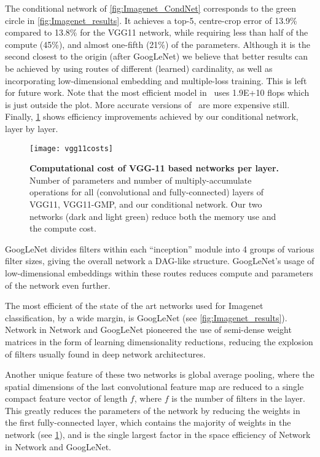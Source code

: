 \documentclass[thesis]{subfiles}
\begin{document}
	The conditional network of \cref{fig:Imagenet_CondNet} 
	corresponds to the green circle in \cref{fig:Imagenet_results}.
	It achieves a top-5, centre-crop error of
	13.9\% compared to 13.8\% for the VGG11 network, while requiring less than half of the compute (45\%),
	and almost one-fifth (21\%) of the parameters.
	Although it is the second closest to the origin (after GoogLeNet) we believe that better results can be achieved 
	by using routes of different (learned) cardinality, as well as incorporating low-dimensional embedding and multiple-loss training. This is left for future work. 
	Note that the most efficient model in~\citep{He2015b} uses 1.9E+10 flops which is just outside the plot. 
	More accurate versions of~\citep{He2015b} are more expensive still.
	Finally, \cref{fig:VggPerLayerCost} shows efficiency improvements achieved by our conditional network, layer by layer.
	
	\begin{figure}[tbp]
		\centering
		\texttt{[image: vgg11costs]}
		\caption[Computational cost of VGG-11 based networks per layer.]{\textbf{Computational cost of VGG-11 based networks per layer.} Number of parameters and number of multiply-accumulate operations for all (convolutional and fully-connected) layers of VGG11, VGG11-GMP, and our conditional network. Our two networks (dark and light green) reduce both the memory use and the compute cost.}\label{fig:VggPerLayerCost}
	\end{figure}
	GoogLeNet divides filters within each ``inception'' module into 4 groups of various filter sizes, giving the overall network a DAG-like structure. GoogLeNet's usage of low-dimensional embeddings within these routes reduces compute and parameters of the network even further.
	
	The most efficient of the state of the art networks used for Imagenet classification, by a wide margin, is GoogLeNet (see \cref{fig:Imagenet_results}). Network in Network and GoogLeNet pioneered the use of semi-dense weight matrices in the form of learning dimensionality reductions, reducing the explosion of filters usually found in deep network architectures.
	
	Another unique feature of these two networks is global average pooling, where the spatial dimensions of the last convolutional feature map are reduced to a single compact feature vector of length $f$, where $f$ is the number of filters in the layer. This greatly reduces the parameters of the network by reducing the weights in the first fully-connected layer, which contains the majority of weights in the network (see \cref{fig:VggPerLayerCost}), and is the single largest factor in the space efficiency of Network in Network and GoogLeNet.
	
\end{document}
